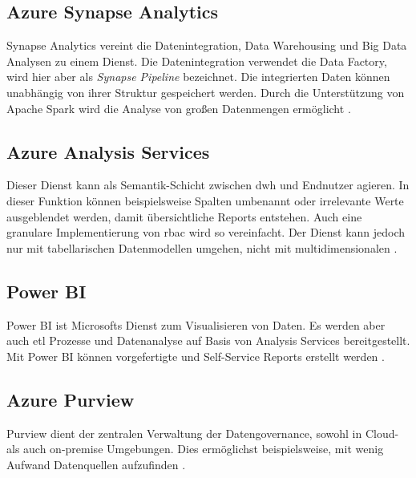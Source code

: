 \subsection{Azure Synapse Analytics} \label{sec:grundlagen:azure_dienste:synapseAnalytics}
Synapse Analytics vereint die Datenintegration, Data Warehousing und Big Data Analysen zu einem Dienst. Die Datenintegration verwendet die Data Factory, wird hier aber als \textit{Synapse Pipeline} bezeichnet. Die integrierten Daten können unabhängig von ihrer Struktur gespeichert werden. Durch die Unterstützung von Apache Spark wird die Analyse von großen Datenmengen ermöglicht \cite{shiyal_beginning_2021}.

\subsection{Azure Analysis Services} \label{sec:grundlagen:azure_dienste:analysisServices}
Dieser Dienst kann als Semantik-Schicht zwischen \ac{dwh} und Endnutzer agieren. In dieser Funktion können beispielsweise Spalten umbenannt oder irrelevante Werte ausgeblendet werden, damit übersichtliche Reports entstehen. Auch eine granulare Implementierung von \ac{rbac} wird so vereinfacht. Der Dienst kann jedoch nur mit tabellarischen Datenmodellen umgehen, nicht mit multidimensionalen \cite{how_beyond_2020}.

\subsection{Power BI} \label{sec:grundlagen:azure_dienste:powerBI}
Power BI ist Microsofts Dienst zum Visualisieren von Daten. Es werden aber auch \ac{etl} Prozesse und Datenanalyse auf Basis von Analysis Services bereitgestellt. Mit Power BI können vorgefertigte und Self-Service Reports erstellt werden \cite{how_beyond_2020}.

\subsection{Azure Purview} \label{sec:grundlagen:azure_dienste:purview}
Purview dient der zentralen Verwaltung der Datengovernance, sowohl in Cloud- als auch on-premise Umgebungen. Dies ermöglichst beispielsweise, mit wenig Aufwand Datenquellen aufzufinden \cite{lesteve_purview_2021}.